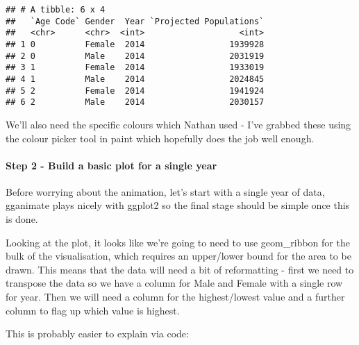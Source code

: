 \documentclass[]{article}
\newenvironment{Shaded}{\begin{snugshade}}{\end{snugshade}}
\newcommand{\KeywordTok}[1]{\textcolor[rgb]{0.13,0.29,0.53}{\textbf{#1}}}
\newcommand{\StringTok}[1]{\textcolor[rgb]{0.31,0.60,0.02}{#1}}
\newcommand{\NormalTok}[1]{#1}
\let\oldparagraph\paragraph
\renewcommand{\paragraph}[1]{\oldparagraph{#1}\mbox{}}
\begin{document}
\begin{verbatim}
## # A tibble: 6 x 4
##   `Age Code` Gender  Year `Projected Populations`
##   <chr>      <chr>  <int>                   <int>
## 1 0          Female  2014                 1939928
## 2 0          Male    2014                 2031919
## 3 1          Female  2014                 1933019
## 4 1          Male    2014                 2024845
## 5 2          Female  2014                 1941924
## 6 2          Male    2014                 2030157
\end{verbatim}

We'll also need the specific colours which Nathan used - I've grabbed
these using the colour picker tool in paint which hopefully does the job
well enough.

\begin{Shaded}
\end{Shaded}

\paragraph{Step 2 - Build a basic plot for a single
year}\label{step-2---build-a-basic-plot-for-a-single-year}

Before worrying about the animation, let's start with a single year of
data, gganimate plays nicely with ggplot2 so the final stage should be
simple once this is done.

Looking at the plot, it looks like we're going to need to use
geom\_ribbon for the bulk of the visualisation, which requires an
upper/lower bound for the area to be drawn. This means that the data
will need a bit of reformatting - first we need to transpose the data so
we have a column for Male and Female with a single row for year. Then we
will need a column for the highest/lowest value and a further column to
flag up which value is highest.

This is probably easier to explain via code:
\end{document}
